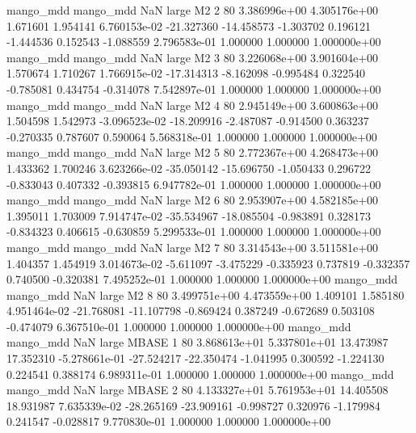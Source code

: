 mango_mdd mango_mdd                   NaN      large       M2                 2 80 3.386996e+00   4.305176e+00      1.671601       1.954141  6.760153e-02    -21.327360    -14.458573    -1.303702       0.196121 -1.444536   0.152543    -1.088559   2.796583e-01            1.000000        1.000000        1.000000e+00
mango_mdd mango_mdd                   NaN      large       M2                 3 80 3.226068e+00   3.901604e+00      1.570674       1.710267  1.766915e-02    -17.314313     -8.162098    -0.995484       0.322540 -0.785081   0.434754    -0.314078   7.542897e-01            1.000000        1.000000        1.000000e+00
mango_mdd mango_mdd                   NaN      large       M2                 4 80 2.945149e+00   3.600863e+00      1.504598       1.542973 -3.096523e-02    -18.209916     -2.487087    -0.914500       0.363237 -0.270335   0.787607     0.590064   5.568318e-01            1.000000        1.000000        1.000000e+00
mango_mdd mango_mdd                   NaN      large       M2                 5 80 2.772367e+00   4.268473e+00      1.433362       1.700246  3.623266e-02    -35.050142    -15.696750    -1.050433       0.296722 -0.833043   0.407332    -0.393815   6.947782e-01            1.000000        1.000000        1.000000e+00
mango_mdd mango_mdd                   NaN      large       M2                 6 80 2.953907e+00   4.582185e+00      1.395011       1.703009  7.914747e-02    -35.534967    -18.085504    -0.983891       0.328173 -0.834323   0.406615    -0.630859   5.299533e-01            1.000000        1.000000        1.000000e+00
mango_mdd mango_mdd                   NaN      large       M2                 7 80 3.314543e+00   3.511581e+00      1.404357       1.454919  3.014673e-02     -5.611097     -3.475229    -0.335923       0.737819 -0.332357   0.740500    -0.320381   7.495252e-01            1.000000        1.000000        1.000000e+00
mango_mdd mango_mdd                   NaN      large       M2                 8 80 3.499751e+00   4.473559e+00      1.409101       1.585180  4.951464e-02    -21.768081    -11.107798    -0.869424       0.387249 -0.672689   0.503108    -0.474079   6.367510e-01            1.000000        1.000000        1.000000e+00
mango_mdd mango_mdd                   NaN      large    MBASE                 1 80 3.868613e+01   5.337801e+01     13.473987      17.352310 -5.278661e-01    -27.524217    -22.350474    -1.041995       0.300592 -1.224130   0.224541     0.388174   6.989311e-01            1.000000        1.000000        1.000000e+00
mango_mdd mango_mdd                   NaN      large    MBASE                 2 80 4.133327e+01   5.761953e+01     14.405508      18.931987  7.635339e-02    -28.265169    -23.909161    -0.998727       0.320976 -1.179984   0.241547    -0.028817   9.770830e-01            1.000000        1.000000        1.000000e+00
